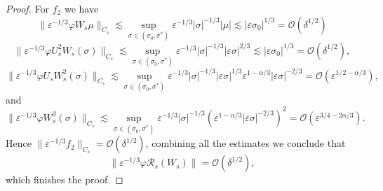 \documentclass[letterpaper,11pt]{article}
\newcommand{\Ral}{\mathcal{R}}
\newcommand{\rmO}{\mathcal{O}}
\newcommand{\eps}{\varepsilon}
\newcommand{\lar}{ \lesssim }
\numberwithin{equation}{section}
\theoremstyle{plain}
\begin{document}
\begin{proof}
For $f_2$ we have
\[
\|\eps^{-1/3}\varphi W_s\mu\|_{C_s} \lar \sup_{\sigma \in (\sigma_0, \sigma^{*})} \eps^{-1/3}|\sigma|^{-1/3}|\mu| \lar |\eps \sigma_0|^{1/3} = \rmO(\delta^{1/2})
\]
\[
\|\eps^{-1/3}\varphi U_s^2W_s(\sigma) \|_{C_s}  \lar \sup_{\sigma \in (\sigma_0, \sigma^{*})}\eps^{-1/3}|\sigma|^{-1/3} |\eps \sigma|^{2/3} \lar |\eps \sigma_0|^{1/3}= \rmO(\delta^{1/2}),
\]
\[
\|\eps^{-1/3}\varphi U_sW_s^2(\sigma) \|_{C_s}  \lar \sup_{\sigma \in (\sigma_0, \sigma^{*})}\eps^{-1/3}|\sigma|^{-1/3} |\eps \sigma|^{1/3}\eps^{1-\alpha/3}|\eps\sigma|^{-2/3} = \rmO(\eps^{1/2-\alpha/3}),
\]
and
\[
\|\eps^{-1/3}\varphi W_s^3(\sigma) \|_{C_s}  \lar \sup_{\sigma \in (\sigma_0, \sigma^{*})}\eps^{-1/3}|\sigma|^{-1/3} (\eps^{1-\alpha/3}|\eps\sigma|^{-2/3})^2 = \rmO(\eps^{3/4-2\alpha/3}).
\]
Hence $\|\eps^{-1/3}f_2\|_{C_s} = \rmO(\delta^{1/2})$, combining all the estimates we conclude that 
\[
\|\eps^{-1/3}\varphi \Ral_s(W_s) \| = \rmO(\delta^{1/2}),
\]
which finishes the proof.
\end{proof}
\end{document}
